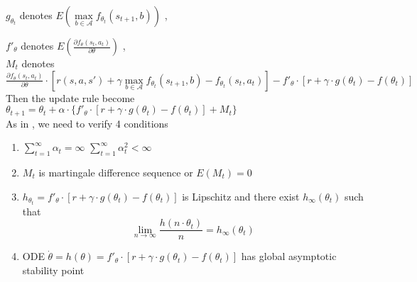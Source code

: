 \documentclass[10pt,a4paper]{article}
\theoremstyle{definition}
\theoremstyle{remark}
\begin{document}
		
		    $g_{\theta_t}$	denotes $E\left(\max\limits_{b\in \mathcal{A}}f_{\theta_t}(s_{t+1},b)\right) $ ,
		    
		    
		 $f'_\theta  $ denotes $E\left(\frac{\partial{f_\theta(s_t,a_t)}}{\partial{\theta}}\right)$ ,\\
		 
		 
		  $ M_t $ denotes $\frac{\partial{f_\theta(s_t,a_t)}}{\partial{\theta}}\cdot [r(s,a,s')+\gamma\max\limits_{b\in \mathcal{A}}f_{\theta_t}(s_{t+1},b)-f_{\theta_t}(s_t,a_t) ] - f'_\theta\cdot[r+\gamma\cdot g(\theta_t)-f(\theta_t)]$\\


		 Then the update rule become $ \theta_{t+1} = \theta_t + \alpha \cdot \{f'_\theta\cdot\left[r+\gamma\cdot g(\theta_t)-f(\theta_t)\right]+M_t \} $\\
		 
		 As in , we need to verify 4 conditions
						
		\begin{enumerate}[(1)]
			\item $\sum_{t=1}^{\infty}\alpha_t =\infty  $    \quad $\sum_{t=1}^{\infty}\alpha_t^2<\infty$
			\item $M_t$ is martingale difference sequence or $ E\left( M_t \right)=0   $
			\item $ h_{\theta_t}  =f'_\theta\cdot \left[r+\gamma\cdot g(\theta_t)-f(\theta_t)\right]  $ is Lipschitz and there exist $h_\infty(\theta_t)$ such that
			\begin{equation}
			\lim_{n\to \infty}\frac{h\left(n\cdot\theta_t\right)}{n}=h_\infty(\theta_t)
			\end{equation} 
			
			\item ODE $\dot{\theta} = h(\theta)=f'_\theta\cdot \left[r+\gamma\cdot g(\theta_t)-f(\theta_t)\right] $ has global asymptotic stability point
		\end{enumerate}
				
				
		
		
		
	
	
\end{document}
